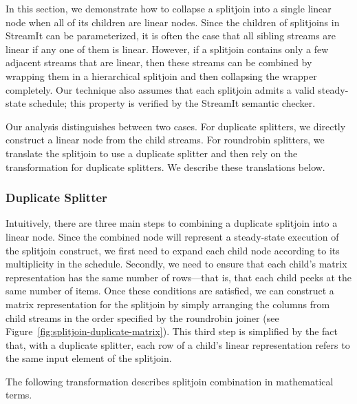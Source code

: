 {In this section, we demonstrate how to collapse a splitjoin into
a single linear node when all of its children are linear nodes.  Since
the children of splitjoins in StreamIt can be parameterized, it
is often the case that all sibling streams are linear if any one of
them is linear.  However, if a splitjoin contains only a few
adjacent streams that are linear, then these streams can be combined
by wrapping them in a hierarchical splitjoin and then collapsing the
wrapper completely.  Our technique also assumes that each 
splitjoin admits a valid steady-state schedule; this property is
verified by the StreamIt semantic checker.

Our analysis distinguishes between two cases. For duplicate splitters,
we directly construct a linear node from the child streams.  For
roundrobin splitters, we translate the splitjoin to use a duplicate
splitter and then rely on the transformation for duplicate splitters.
We describe these translations below.

\subsubsection{Duplicate Splitter}

Intuitively, there are three main steps to combining a duplicate
splitjoin into a linear node.  Since the combined node will represent
a steady-state execution of the splitjoin construct, we first need to
expand each child node according to its multiplicity in the schedule.
Secondly, we need to ensure that each child's matrix representation
has the same number of rows---that is, that each child peeks at the
same number of items.  Once these conditions are satisfied, we can
construct a matrix representation for the splitjoin by simply
arranging the columns from child streams in the order specified by the
roundrobin joiner (see Figure~\ref{fig:splitjoin-duplicate-matrix}).
This third step is simplified by the fact that, with a duplicate
splitter, each row of a child's linear representation refers to the
same input element of the splitjoin.

The following transformation describes splitjoin combination in
mathematical terms.


}

